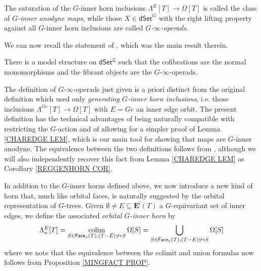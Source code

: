 \documentclass[a4paper,10pt
,draft
]{article}%
\begin{document}
The saturation of the $G$-inner horn inclusions 
$\Lambda^E[T] \to \Omega[T]$
is called the class of \textit{$G$-inner anodyne maps}, 
while those $X \in \mathsf{dSet}^G$
with the right lifting property against all $G$-inner horn inclusions are called \textit{$G$-$\infty$-operads}.

We can now recall the statement of \cite[Thm 2.1]{Per18}, which was the main result therein.

\begin{theorem}
	There is a model structure on $\mathsf{dSet^G}$
	such that the cofibrations are the normal monomorphisms and the fibrant objects are the $G$-$\infty$-operads.
\end{theorem}


\begin{remark}
The definition of $G$-$\infty$-operads just given is a priori distinct from the original definition \cite[Def. 6.12]{Per18} which used only 
\textit{generating $G$-inner horn inclusions}, i.e. 
those inclusions $\Lambda^{Ge}[T] \to \Omega[T]$ with $E=Ge$ an inner edge orbit.
The present definition has the technical advantages of being naturally compatible with restricting the $G$-action and of allowing for a simpler proof of Lemma \ref{CHAREDGE LEM}, 
which is our main tool for showing that maps
are $G$-inner anodyne.
The equivalence between the two definitions follows from 
\cite[Prop. 6.17]{Per18},
although we will also independently recover this fact
from Lemma \ref{CHAREDGE LEM} as Corollary \ref{REGGENHORN COR}.
\end{remark}


In addition to the $G$-inner horns defined above, we now introduce a new kind of horn that, much like orbital faces,
is naturally suggested by the orbital representation of $G$-trees.
Given $\emptyset \neq E \subseteq \boldsymbol{E}^{\mathsf{i}}(T)$ a $G$-equivariant set of inner edges, we define the associated 
\textit{orbital $G$-inner horn} by
\[
	\Lambda^{E}_o[T] = 
	\mathop{\operatorname{colim}}_{S \in 
	\mathsf{Face}_o(T),
	(T - E) \not \hookrightarrow S}
	\Omega[S] =
	\bigcup_{S \in 
	\mathsf{Face}_o(T),
	(T - E) \not \hookrightarrow S}
	\Omega[S]
\]
where we note that the equivalence between the colimit and union formulas now follows from Proposition \ref{MINGFACT PROP}.
\end{document}
